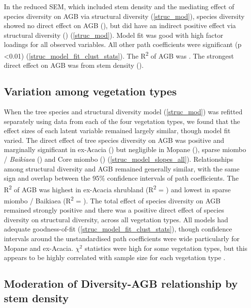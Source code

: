 \documentclass[12pt,a4paper]{article}
\begin{document}
In the reduced SEM, which included stem density and the mediating effect of species diversity on AGB via structural diversity (\autoref{struc_mod}), species diversity showed no direct effect on AGB (\strucbetadb{}), but did have an indirect positive effect via structural diversity (\strucbetadib{}) (\autoref{struc_mod}). Model fit was good with high factor loadings for all observed variables. All other path coefficients were significant (p <0.01) (\autoref{struc_model_fit_clust_stats}). The R\textsuperscript{2} of AGB was \strucrsq{}. The strongest direct effect on AGB was from stem density (\strucbetaib{}).

\subsection{Variation among vegetation types}

When the tree species and structural diversity model (\autoref{struc_mod}) was refitted separately using data from each of the four vegetation types, we found that the effect sizes of each latent variable remained largely similar, though model fit varied. The direct effect of tree species diversity on AGB was positive and marginally significant in ex-Acacia (\strucbetacsb{}) but negligible in Mopane (\strucbetadsb{}), sparse miombo / \textit{Baikiaea} (\strucbetaasb{}) and Core miombo (\strucbetabsb{}) (\autoref{struc_model_slopes_all}). Relationships among structural diversity and AGB remained generally similar, with the same sign and overlap between the 95\% confidence intervals of path coefficients. The R\textsuperscript{2} of AGB was highest in ex-Acacia shrubland (R\textsuperscript{2} = \struccrsq{}) and lowest in sparse miombo / Baikiaea (R\textsuperscript{2} = \strucarsq{}). The total effect of species diversity on AGB remained strongly positive and there was a positive direct effect of species diversity on structural diversity, across all vegetation types. All models had adequate goodness-of-fit (\autoref{struc_model_fit_clust_stats}), though confidence intervals around the unstandardised path coefficients were wide particularly for Mopane and ex-Acacia. $\chi^{2}$ statistics were high for some vegetation types, but this appears to be highly correlated with sample size for each vegetation type \citep{Hooper2008}.


\subsection{Moderation of Diversity-AGB relationship by stem density}
\end{document}
